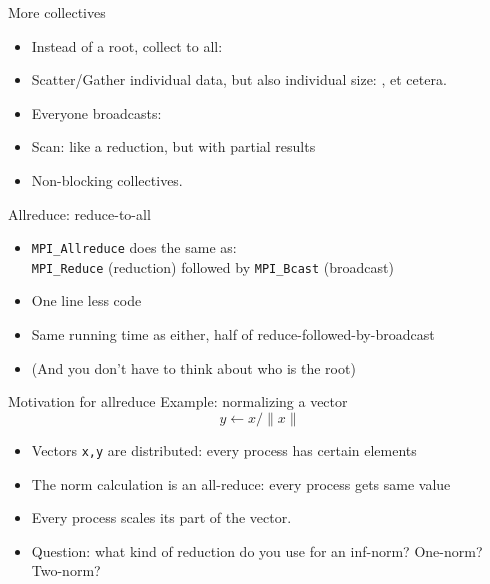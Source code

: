 
\begin{exerciseframe}
  
\end{exerciseframe}

\begin{numberedframe}{More collectives}
  \begin{itemize}
  \item Instead of a root, collect to all: 
  \item Scatter/Gather individual data, but also individual size:
    ,  et cetera.
  \item Everyone broadcasts: 
  \item Scan: like a reduction, but with partial results
  \item Non-blocking collectives.
  \end{itemize}
\end{numberedframe}


\begin{numberedframe}{Allreduce: reduce-to-all}
  \begin{itemize}
  \item \lstinline{MPI_Allreduce} does the same as:\\
    \lstinline{MPI_Reduce} (reduction) followed by \lstinline{MPI_Bcast} (broadcast)
  \item One line less code
  \item Same running time as either, half of reduce-followed-by-broadcast
  \item (And you don't have to think about who is the root)
  \end{itemize}
\end{numberedframe}

\begin{numberedframe}{Motivation for allreduce}
  Example: normalizing a vector
  \[ y \leftarrow x/\|x\| \]
  \begin{itemize}
  \item Vectors \lstinline{x,y} are distributed: every process has certain
    elements
  \item The norm calculation is an all-reduce: every process gets same
    value
  \item Every process scales its part of the vector.
  \item Question: what kind of reduction do you use for an inf-norm? One-norm? Two-norm?
  \end{itemize}
\end{numberedframe}

